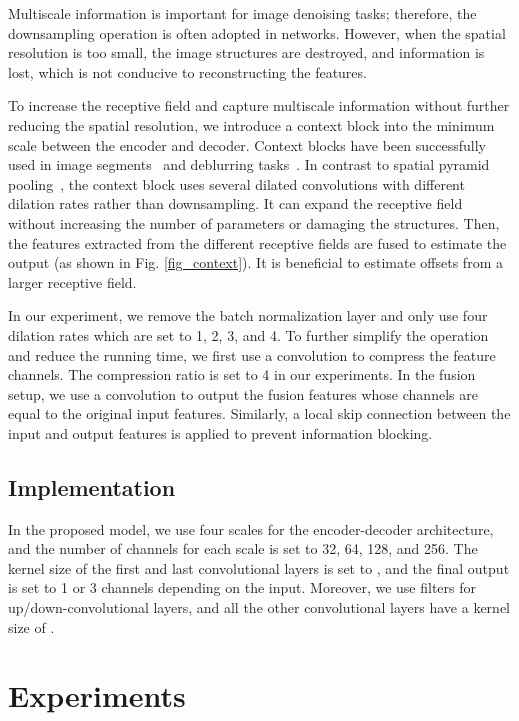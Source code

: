 \documentclass[runningheads]{llncs}
\begin{document}
Multiscale information is important for image denoising tasks; therefore, the downsampling operation is often adopted in networks. However, when the spatial resolution is too small, the image structures are destroyed, and information is lost, which is not conducive to reconstructing the features.

To increase the receptive field and capture multiscale information without further reducing the spatial resolution, we introduce a context block into the minimum scale between the encoder and decoder. Context blocks have been successfully used in image segments~\cite{chen2017rethinking} and deblurring tasks~\cite{zhou2019davanet}. In contrast to spatial pyramid pooling~\cite{he2015spatial}, the context block uses several dilated convolutions with different dilation rates rather than downsampling. 
It can expand the receptive field without increasing the number of parameters or damaging the structures. Then, the features extracted from the different receptive fields are fused to estimate the output (as shown in Fig. \ref{fig_context}). It is beneficial to estimate offsets from a larger receptive field. 

In our experiment, we remove the batch normalization layer and only use four dilation rates which are set to 1, 2, 3, and 4. To further simplify the operation and reduce the running time, we first use a  convolution to compress the feature channels. The compression ratio is set to 4 in our experiments. In the fusion setup, we use a  convolution to output the fusion features whose channels are equal to the original input features. Similarly, a local skip connection between the input and output features is applied to prevent information blocking.

\subsection{Implementation}

In the proposed model, we use four scales for the encoder-decoder architecture, and the number of channels for each scale is set to 32, 64, 128, and 256. The kernel size of the first and last convolutional layers is set to , and the final output is set to 1 or 3 channels depending on the input. Moreover, we use  filters for up/down-convolutional layers, and all the other convolutional layers have a kernel size of .
\section{Experiments}
\end{document}

